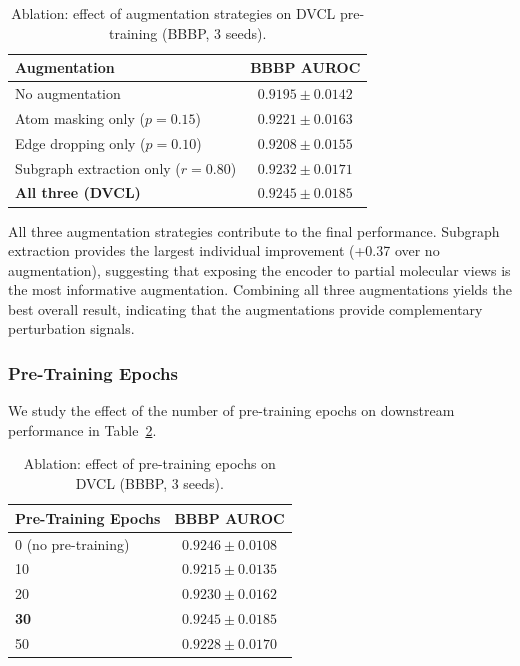\documentclass[a4paper,fleqn]{cas-sc}
\begin{document}
\begin{table}[!t]
\centering
\caption{Ablation: effect of augmentation strategies on DVCL pre-training (BBBP, 3 seeds).}
\label{tab:ablation_aug}
\begin{tabular}{l c}
\toprule
\textbf{Augmentation} & \textbf{BBBP AUROC} \\
\midrule
No augmentation                              & $0.9195 \pm 0.0142$ \\
Atom masking only ($p = 0.15$)               & $0.9221 \pm 0.0163$ \\
Edge dropping only ($p = 0.10$)              & $0.9208 \pm 0.0155$ \\
Subgraph extraction only ($r = 0.80$)        & $0.9232 \pm 0.0171$ \\
\textbf{All three (DVCL)}                    & $\mathbf{0.9245 \pm 0.0185}$ \\
\bottomrule
\end{tabular}
\end{table}

All three augmentation strategies contribute to the final performance. Subgraph extraction provides the largest individual improvement (+0.37 over no augmentation), suggesting that exposing the encoder to partial molecular views is the most informative augmentation. Combining all three augmentations yields the best overall result, indicating that the augmentations provide complementary perturbation signals.

\subsubsection{Pre-Training Epochs}

We study the effect of the number of pre-training epochs on downstream performance in Table~\ref{tab:ablation_epochs}.

\begin{table}[!t]
\centering
\caption{Ablation: effect of pre-training epochs on DVCL (BBBP, 3 seeds).}
\label{tab:ablation_epochs}
\begin{tabular}{l c}
\toprule
\textbf{Pre-Training Epochs} & \textbf{BBBP AUROC} \\
\midrule
0 (no pre-training)   & $0.9246 \pm 0.0108$ \\
10                    & $0.9215 \pm 0.0135$ \\
20                    & $0.9230 \pm 0.0162$ \\
\textbf{30}           & $\mathbf{0.9245 \pm 0.0185}$ \\
50                    & $0.9228 \pm 0.0170$ \\
\bottomrule
\end{tabular}
\end{table}
\end{document}
